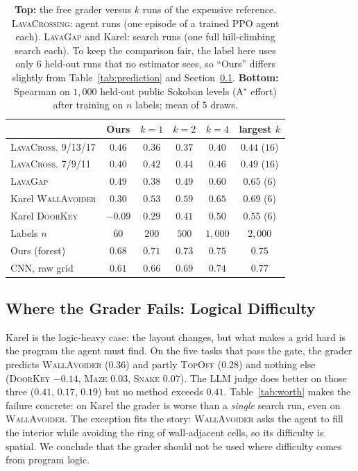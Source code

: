 \documentclass[twoside]{article}
\begin{document}
\begin{table}[t]
\centering
\small
\caption{\textbf{Top:} the free grader versus $k$ runs of the expensive reference. \textsc{LavaCrossing}: agent runs (one episode of a trained PPO agent each). \textsc{LavaGap} and Karel: search runs (one full hill-climbing search each). To keep the comparison fair, the label here uses only $6$ held-out runs that no estimator sees, so ``Ours'' differs slightly from Table~\ref{tab:prediction} and Section~\ref{sec:results-karel}. \textbf{Bottom:} Spearman on $1{,}000$ held-out public Sokoban levels (A$^\star$ effort) after training on $n$ labels; mean of $5$ draws.}
\label{tab:worth}
\label{tab:fewlabels}
\setlength{\tabcolsep}{3.5pt}
\begin{tabular}{lccccc}
\toprule
 & Ours & $k{=}1$ & $k{=}2$ & $k{=}4$ & largest $k$ \\
\midrule
\textsc{LavaCross.} 9/13/17 & $\mathbf{0.46}$ & $0.36$ & $0.37$ & $0.40$ & $0.44$ ($16$) \\
\textsc{LavaCross.} 7/9/11  & $0.40$ & $0.42$ & $0.44$ & $0.46$ & $0.49$ ($16$) \\
\textsc{LavaGap}            & $0.49$ & $0.38$ & $0.49$ & $0.60$ & $0.65$ ($6$) \\
Karel \textsc{WallAvoider}  & $0.30$ & $0.53$ & $0.59$ & $0.65$ & $0.69$ ($6$) \\
Karel \textsc{DoorKey}      & $-0.09$ & $0.29$ & $0.41$ & $0.50$ & $0.55$ ($6$) \\
\midrule
Labels $n$ & $60$ & $200$ & $500$ & $1{,}000$ & $2{,}000$ \\
\midrule
Ours (forest) & $\mathbf{0.68}$ & $\mathbf{0.71}$ & $\mathbf{0.73}$ & $0.75$ & $0.75$ \\
CNN, raw grid & $0.61$ & $0.66$ & $0.69$ & $0.74$ & $0.77$ \\
\bottomrule
\end{tabular}
\end{table}

\subsection{Where the Grader Fails: Logical Difficulty}
\label{sec:results-karel}

Karel is the logic-heavy case: the layout changes, but what makes a grid hard is the program the agent must find. On the five tasks that pass the gate, the grader predicts \textsc{WallAvoider} ($0.36$) and partly \textsc{TopOff} ($0.28$) and nothing else (\textsc{DoorKey} $-0.14$, \textsc{Maze} $0.03$, \textsc{Snake} $0.07$). The LLM judge does better on those three ($0.41$, $0.17$, $0.19$) but no method exceeds $0.41$. Table~\ref{tab:worth} makes the failure concrete: on Karel the grader is worse than a \emph{single} search run, even on \textsc{WallAvoider}. The exception fits the story: \textsc{WallAvoider} asks the agent to fill the interior while avoiding the ring of wall-adjacent cells, so its difficulty is spatial. We conclude that the grader should not be used where difficulty comes from program logic.
\end{document}
